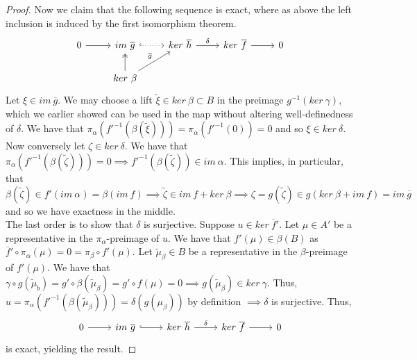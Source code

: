 \documentclass{article}
\begin{document}
\begin{proof}
  Now we claim that the following sequence is exact, where as above the left inclusion is induced by the first isomorphism theorem.
  \[
  \begin{tikzcd}
0 \arrow[r] & im \ \overline g \arrow[r, dotted, hook]                   & ker \ \overline h \arrow[r, "\delta"] & ker \ \overline f \arrow[r] & 0 \\
            & ker \ \beta \arrow[ru, "\overline g"] \arrow[u, two heads] &                                       &                             &     
          \end{tikzcd}
        \]
Let $\xi \in im \ \overline g$. We may choose a lift $\widetilde \xi \in ker \ \beta \subset B$ in the preimage $g^{-1}(ker \ \gamma)$, which we earlier showed can be used in the map without altering well-definedness of $\delta$. We have that $\pi_{\alpha}(f'^{-1}(\beta (\widetilde \xi))) = \pi_{\alpha}(f'^{-1}(0)) = 0$ and so $\xi \in ker \ \delta$. \\ 

Now conversely let $\zeta \in ker \ \delta$. We have that $\pi_{\alpha}(f'^{-1}(\beta (\widetilde \zeta))) = 0 \implies f'^{-1}(\beta(\widetilde \zeta)) \in im \ \alpha$. This implies, in particular, that $\beta(\widetilde \zeta) \in f'(im \ \alpha) = \beta(im \ f) \implies \widetilde \zeta \in im \ f + ker \ \beta \implies \zeta = g(\widetilde \zeta) \in g(ker \ \beta + im \ f) = im \ \overline g$ and so we have exactness in the middle. \\

The last order is to show that $\delta$ is surjective. Suppose $u \in ker \ \overline f'$. Let $\mu \in A'$ be a representative in the $\pi_{\alpha}$-preimage of $u$. We have that $f'(\mu) \in \beta(B)$ as $\overline f'\circ \pi_{\alpha}(\mu) = 0 = \pi_{\beta} \circ f'(\mu)$. Let $\widetilde \mu_{\beta} \in B$ be a representative in the $\beta$-preimage of $f'(\mu)$. We have that $\gamma \circ g(\widetilde \mu_{b}) = g'\circ \beta(\widetilde \mu_{\beta}) = g' \circ f(\mu) = 0 \implies g(\widetilde \mu_{\beta}) \in ker \ \gamma$. Thus, $u = \pi_{\alpha}(f'^{-1}(\beta (\widetilde \mu_{\beta}))) = \delta(g(\mu_{\beta}))$ by definition $\implies \delta$ is surjective. Thus,
\[
  \begin{tikzcd}
0 \arrow[r] & im \ \overline g \arrow[r, hook] & ker \ \overline h \arrow[r, "\delta"] & ker \ \overline f \arrow[r] & 0
\end{tikzcd}
\]
is exact, yielding the result. 
\end{proof}
\end{document}
